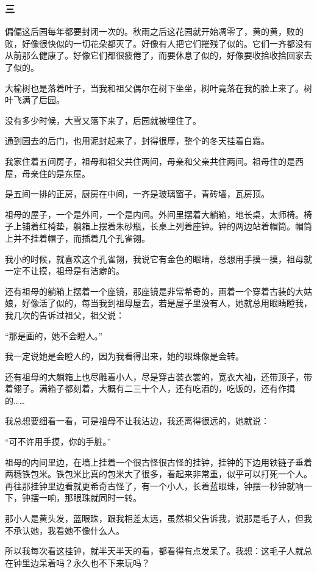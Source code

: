 \subsubsection*{三}
\par 偏偏这后园每年都要封闭一次的。秋雨之后这花园就开始凋零了，黄的黄，败的败，好像很快似的一切花朵都灭了。好像有人把它们摧残了似的。它们一齐都没有从前那么健康了。好像它们都很疲倦了，而要休息了似的，好像要收拾收拾回家去了似的。
\par 大榆树也是落着叶子，当我和祖父偶尔在树下坐坐，树叶竟落在我的脸上来了。树叶飞满了后园。
\par 没有多少时候，大雪又落下来了，后园就被埋住了。
\par 通到园去的后门，也用泥封起来了，封得很厚，整个的冬天挂着白霜。
\par 我家住着五间房子，祖母和祖父共住两间，母亲和父亲共住两间。祖母住的是西屋，母亲住的是东屋。
\par 是五间一排的正房，厨房在中间，一齐是玻璃窗子，青砖墙，瓦房顶。
\par 祖母的屋子，一个是外间，一个是内间。外间里摆着大躺箱，地长桌，太师椅。椅子上铺着红椅垫，躺箱上摆着朱砂瓶，长桌上列着座钟。钟的两边站着帽筒。帽筒上并不挂着帽子，而插着几个孔雀翎。
\par 我小的时候，就喜欢这个孔雀翎，我说它有金色的眼睛，总想用手摸一摸，祖母就一定不让摸，祖母是有洁癖的。
\par 还有祖母的躺箱上摆着一个座镜，那座镜是非常希奇的，画着一个穿着古装的大姑娘，好像活了似的，每当我到祖母屋去，若是屋子里没有人，她就总用眼睛瞪我，我几次的告诉过祖父，祖父说：
\par “那是画的，她不会瞪人。”
\par 我一定说她是会瞪人的，因为我看得出来，她的眼珠像是会转。
\par 还有祖母的大躺箱上也尽雕着小人，尽是穿古装衣裳的，宽衣大袖，还带顶子，带着翎子。满箱子都刻着，大概有二三十个人，还有吃酒的，吃饭的，还有作揖的……
\par 我总想要细看一看，可是祖母不让我沾边，我还离得很远的，她就说：
\par “可不许用手摸，你的手脏。”
\par 祖母的内间里边，在墙上挂着一个很古怪很古怪的挂钟，挂钟的下边用铁链子垂着两穗铁包米。铁包米比真的包米大了很多，看起来非常重，似乎可以打死一个人。再往那挂钟里边看就更希奇古怪了，有一个小人，长着蓝眼珠，钟摆一秒钟就响一下，钟摆一响，那眼珠就同时一转。
\par 那小人是黄头发，蓝眼珠，跟我相差太远，虽然祖父告诉我，说那是毛子人，但我不承认她，我看她不像什么人。
\par 所以我每次看这挂钟，就半天半天的看，都看得有点发呆了。我想：这毛子人就总在钟里边呆着吗？永久也不下来玩吗？

